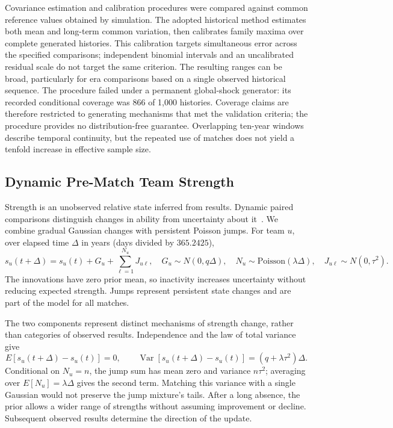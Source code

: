 Covariance estimation and calibration procedures were compared against common reference values obtained by simulation. The adopted historical method estimates both mean and long-term common variation, then calibrates family maxima over complete generated histories. This calibration targets simultaneous error across the specified comparisons; independent binomial intervals and an uncalibrated residual scale do not target the same criterion. The resulting ranges can be broad, particularly for era comparisons based on a single observed historical sequence. The procedure failed under a permanent global-shock generator: its recorded conditional coverage was 866 of 1,000 histories. Coverage claims are therefore restricted to generating mechanisms that met the validation criteria; the procedure provides no distribution-free guarantee. Overlapping ten-year windows describe temporal continuity, but the repeated use of matches does not yield a tenfold increase in effective sample size.



\subsection{Dynamic Pre-Match Team Strength}
\label{sec:strength-method}

Strength is an unobserved relative state inferred from results. Dynamic paired comparisons distinguish changes in ability from uncertainty about it~\cite{glickman1999dynamic}. We combine gradual Gaussian changes with persistent Poisson jumps. For team $u$, over elapsed time $\Delta$ in years (days divided by $365.2425$),
\begin{equation}
 s_u(t+\Delta)=s_u(t)+G_u+\sum_{\ell=1}^{N_u}J_{u\ell},\quad
 G_u\sim N(0,q\Delta),\quad N_u\sim\mathrm{Poisson}(\lambda\Delta),\quad
 J_{u\ell}\sim N(0,\tau^2).
 \label{eq:strength-transition}
\end{equation}
The innovations have zero prior mean, so inactivity increases uncertainty without reducing expected strength. Jumps represent persistent state changes and are part of the model for all matches.

The two components represent distinct mechanisms of strength change, rather than categories of observed results. Independence and the law of total variance give
\begin{equation}
 E[s_u(t+\Delta)-s_u(t)]=0,\qquad
 \operatorname{Var}[s_u(t+\Delta)-s_u(t)]=(q+\lambda\tau^2)\Delta.
 \label{eq:transition-moments}
\end{equation}
Conditional on $N_u=n$, the jump sum has mean zero and variance $n\tau^2$; averaging over $E[N_u]=\lambda\Delta$ gives the second term. Matching this variance with a single Gaussian would not preserve the jump mixture's tails. After a long absence, the prior allows a wider range of strengths without assuming improvement or decline. Subsequent observed results determine the direction of the update.

